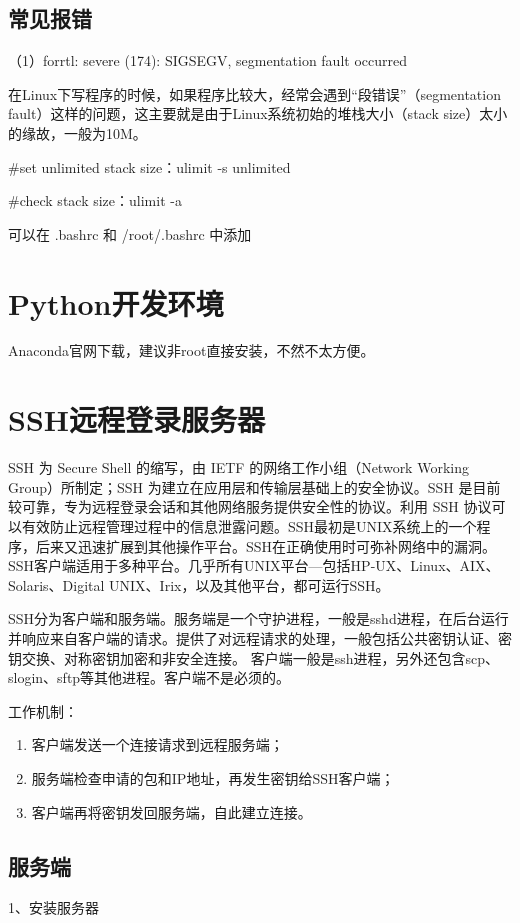 \subsection{常见报错}
（1）forrtl: severe (174): SIGSEGV, segmentation fault occurred

在Linux下写程序的时候，如果程序比较大，经常会遇到“段错误”（segmentation fault）这样的问题，这主要就是由于Linux系统初始的堆栈大小（stack size）太小的缘故，一般为10M。

\#set unlimited stack size：ulimit -s unlimited

\#check stack size：ulimit -a

可以在 .bashrc 和 /root/.bashrc 中添加



\section{Python开发环境}
Anaconda官网下载，建议非root直接安装，不然不太方便。


\section{SSH远程登录服务器}
SSH 为 Secure Shell 的缩写，由 IETF 的网络工作小组（Network Working Group）所制定；SSH 为建立在应用层和传输层基础上的安全协议。SSH 是目前较可靠，专为远程登录会话和其他网络服务提供安全性的协议。利用 SSH 协议可以有效防止远程管理过程中的信息泄露问题。SSH最初是UNIX系统上的一个程序，后来又迅速扩展到其他操作平台。SSH在正确使用时可弥补网络中的漏洞。SSH客户端适用于多种平台。几乎所有UNIX平台—包括HP-UX、Linux、AIX、Solaris、Digital UNIX、Irix，以及其他平台，都可运行SSH。

SSH分为客户端和服务端。服务端是一个守护进程，一般是sshd进程，在后台运行并响应来自客户端的请求。提供了对远程请求的处理，一般包括公共密钥认证、密钥交换、对称密钥加密和非安全连接。
客户端一般是ssh进程，另外还包含scp、slogin、sftp等其他进程。客户端不是必须的。

工作机制：
\begin{enumerate}
\item 客户端发送一个连接请求到远程服务端；
\item 服务端检查申请的包和IP地址，再发生密钥给SSH客户端；
\item 客户端再将密钥发回服务端，自此建立连接。
\end{enumerate}


\subsection{服务端}
1、安装服务器

